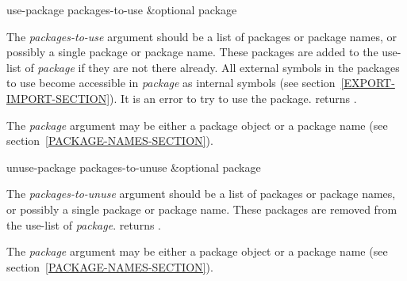 \begin{defun}[Function]
use-package packages-to-use &optional package

The \emph{packages-to-use} argument should be a list of packages or package
names, or possibly a single package or package name.  These packages are
added to the use-list of \emph{package} if they are not there already.  All
external symbols in the packages to use become accessible in \emph{package}
as internal symbols
(see section~\ref{EXPORT-IMPORT-SECTION}).
It is an error to try to use the  package.
 returns {\true}.

The \emph{package} argument may be either a package object
or a package name (see section~\ref{PACKAGE-NAMES-SECTION}).
\end{defun}

\begin{defun}[Function]
unuse-package packages-to-unuse &optional package

The \emph{packages-to-unuse} argument should be a list of packages or
package names, or possibly a single package or package name.  These
packages are removed from the use-list of \emph{package}.
 returns {\true}.

The \emph{package} argument may be either a package object
or a package name (see section~\ref{PACKAGE-NAMES-SECTION}).
\end{defun}


